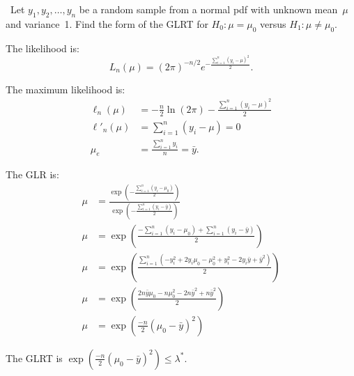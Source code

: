 \begin{problem}
  ~Let ${y_1,y_2,\ldots,y_n}$ be a random sample from a normal pdf with unknown mean~$\mu$ and variance~1.  Find the form of the GLRT for ${H_0: \mu = \mu_0}$ versus ${H_1: \mu \ne \mu_0}$.
\end{problem}

The likelihood is:
\begin{equation}
  L_{n}(\mu) = \left( 2 \pi \right)^{-n/2} e^{-\frac{\sum_{i=1}^{n}(y_i - \mu)^2}{2}} \text{.}
\end{equation}

The maximum likelihood is:
\begin{align}
  \ell_{n}(\mu)  &= -\frac{n}{2} \ln(2\pi) - \frac{\sum_{i=1}^{n} (y_i - \mu)^2}{2} \\
  \ell'_{n}(\mu) &=  \sum_{i=1}^{n} (y_i - \mu) = 0 \\
           \mu_e &= \frac{\sum_{i=1}^{n} y_i}{n} = \bar{y} \text{.}
\end{align}

The GLR is:
\begin{align}
  \mu &= \frac{\exp\left( -\frac{\sum_{i=1}^{n} (y_i - \mu_0)}{2} \right)}{\exp\left( -\frac{\sum_{i=1}^{n} (y_i - \bar{y})}{2} \right)} \\
  \mu &= \exp\left( \frac{ - \sum_{i=1}^{n} (y_i - \mu_0) + \sum_{i=1}^{n} (y_i - \bar{y})}{2} \right) \\
  \mu &= \exp\left( \frac{\sum_{i=1}^{n} (-y_{i}^{2} + 2y_i \mu_0  - \mu^2_0 + y^2_i - 2y_i \bar{y}  + \bar{y}^2)}{2} \right) \\
  \mu &= \exp\left( \frac{2n \bar{y} \mu_0  - n\mu^2_0 - 2n\bar{y}^2 + n\bar{y}^2}{2} \right) \\
  \mu &= \exp\left(\frac{-n}{2} (\mu_0 - \bar{y})^2 \right)
\end{align}

The GLRT is ${\exp\left(\frac{-n}{2} (\mu_0 - \bar{y})^2 \right) \leq \lambda^{*}}$.
